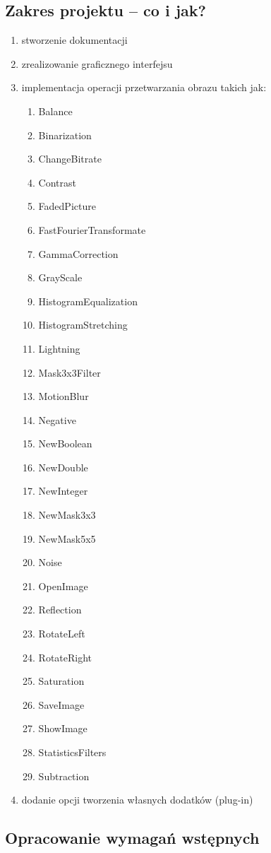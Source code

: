 \subsection{Zakres projektu – co i jak?}
\begin{enumerate}
\item stworzenie dokumentacji
\item zrealizowanie graficznego interfejsu
\item implementacja operacji przetwarzania obrazu takich jak: \\
\begin{enumerate}[I]
\item Balance
\item Binarization
\item ChangeBitrate
\item Contrast
\item FadedPicture
\item FastFourierTransformate
\item GammaCorrection
\item GrayScale
\item HistogramEqualization
\item HistogramStretching
\item Lightning
\item Mask3x3Filter
\item MotionBlur
\item Negative
\item NewBoolean
\item NewDouble
\item NewInteger
\item NewMask3x3
\item NewMask5x5
\item Noise
\item OpenImage
\item Reflection
\item RotateLeft
\item RotateRight
\item Saturation
\item SaveImage
\item ShowImage
\item StatisticsFilters
\item Subtraction
\end{enumerate}
\item dodanie opcji tworzenia własnych dodatków (plug-in)
\end{enumerate}
\subsection{Opracowanie wymagań wstępnych}
